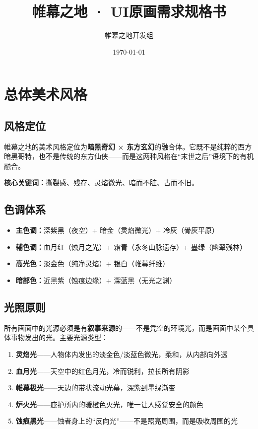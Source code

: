 \documentclass[12pt,a4paper,openany]{ctexbook}
\begin{document}
\title{帷幕之地 · UI原画需求规格书}
\author{帷幕之地开发组}
\date{\today}
\maketitle
\tableofcontents
\newpage

\chapter{总体美术风格}

\section{风格定位}

帷幕之地的美术风格定位为\textbf{暗黑奇幻 × 东方玄幻}的融合体。它既不是纯粹的西方暗黑哥特，也不是传统的东方仙侠——而是这两种风格在“末世之后”语境下的有机融合。

\textbf{核心关键词：}撕裂感、残存、灵焰微光、暗而不脏、古而不旧。

\section{色调体系}

\begin{itemize}
    \item \textbf{主色调：}深紫黑（夜空）+ 暗金（灵焰微光）+ 冷灰（骨灰平原）
    \item \textbf{辅色调：}血月红（蚀月之光）+ 霜青（永冬山脉遗存）+ 墨绿（幽翠残林）
    \item \textbf{高光色：}淡金色（纯净灵焰）+ 银白（帷幕纤维）
    \item \textbf{暗部色：}近黑紫（蚀痕边缘）+ 深蓝黑（无光之渊）
\end{itemize}

\section{光照原则}

所有画面中的光源必须是有\textbf{叙事来源}的——不是凭空的环境光，而是画面中某个具体事物发出的光。主要光源类型：

\begin{enumerate}
    \item \textbf{灵焰光}——人物体内发出的淡金色/淡蓝色微光，柔和，从内部向外透
    \item \textbf{血月光}——天空中的红色月光，冷而锐利，拉长所有阴影
    \item \textbf{帷幕极光}——天边的带状流动光幕，深紫到墨绿渐变
    \item \textbf{炉火光}——庇护所内的暖橙色火光，唯一让人感觉安全的颜色
    \item \textbf{蚀痕黑光}——蚀者身上的“反向光”——不是照亮周围，而是吸收周围的光
\end{enumerate}
\end{document}
